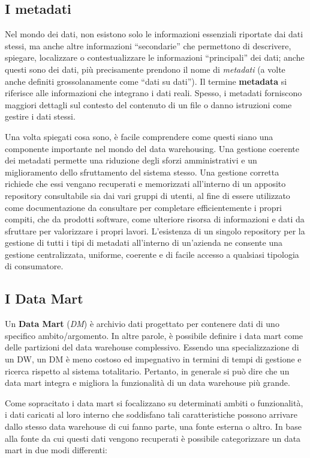 \subsection{I metadati}

Nel mondo dei dati, non esistono solo le informazioni essenziali riportate dai dati stessi, ma anche altre informazioni “secondarie” che permettono di descrivere, spiegare, localizzare o contestualizzare le informazioni “principali” dei dati; anche questi sono dei dati, più precisamente prendono il nome di \textit{metadati} (a volte anche definiti grossolanamente come “dati su dati”). Il termine \textbf{metadata} si riferisce alle informazioni che integrano i dati reali. Spesso, i metadati forniscono maggiori dettagli sul contesto del contenuto di un file o danno istruzioni come gestire i dati stessi.\cite{ionos_metadata}

Una volta spiegati cosa sono, è facile comprendere come questi siano una componente importante nel mondo del data warehousing. Una gestione coerente dei metadati permette una riduzione degli sforzi amministrativi e un miglioramento dello sfruttamento del sistema stesso. Una gestione corretta richiede che essi vengano recuperati e memorizzati all'interno di un apposito repository consultabile sia dai vari gruppi di utenti, al fine di essere utilizzato come documentazione da consultare per completare efficientemente i propri compiti, che da prodotti software, come ulteriore risorsa di informazioni e dati da sfruttare per valorizzare i propri lavori. L'esistenza di un singolo repository per la gestione di tutti i tipi di metadati all'interno di un'azienda ne consente una gestione centralizzata, uniforme, coerente e di facile accesso a qualsiasi tipologia di consumatore.\cite{metadata_standards}

\subsection{I Data Mart}

Un \textbf{Data Mart} (\textit{DM}) è archivio dati progettato per contenere dati di uno specifico ambito/argomento. In altre parole, è possibile definire i data mart come delle partizioni del data warehouse complessivo. Essendo una specializzazione di un DW, un DM è meno costoso ed impegnativo in termini di tempi di gestione e ricerca rispetto al sistema totalitario. Pertanto, in generale si può dire che un data mart integra e migliora la funzionalità di un data warehouse più grande.

Come sopracitato i data mart si focalizzano su determinati ambiti o funzionalità, i dati caricati al loro interno che soddisfano tali caratteristiche possono arrivare dallo stesso data warehouse di cui fanno parte, una fonte esterna o altro. In base alla fonte da cui questi dati vengono recuperati è possibile categorizzare un data mart in due modi differenti:\cite{itl_data_warehousing_and_mining}

